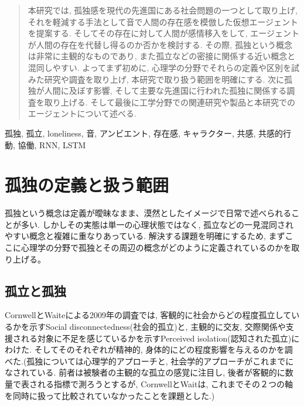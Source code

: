 \documentclass[a4paper,dvipdfmx]{hisken}
\begin{document}

\begin{abstract}
本研究では, 孤独感を現代の先進国にある社会問題の一つとして取り上げ, それを軽減する手法として音で人間の存在感を模倣した仮想エージェントを提案する. そしてその存在に対して人間が感情移入をして, エージェントが人間の存在を代替し得るのか否かを検討する. その際, 孤独という概念は非常に主観的なものであり, また孤立などの密接に関係する近い概念と混同しやすい. よってまず初めに, 心理学の分野でそれらの定義や区別を試みた研究や調査を取り上げ, 本研究で取り扱う範囲を明確にする. 次に孤独が人間に及ぼす影響, そして主要な先進国に行われた孤独に関係する調査を取り上げる. そして最後に工学分野での関連研究や製品と本研究でのエージェントについて述べる.
\end{abstract}

\begin{keyword}	
孤独, 孤立, loneliness, 音, アンビエント, 存在感, キャラクター, 共感, 共感的行動, 協働, RNN, LSTM
\end{keyword}

\maketitle
	
\section{孤独の定義と扱う範囲}
孤独という概念は定義が曖昧なまま、漠然としたイメージで日常で述べられることが多い. しかしその実態は単一の心理状態ではなく, 孤立などの一見混同されやすい概念と複雑に重なりあっている. 解決する課題を明確にするため, まずここに心理学の分野で孤独とその周辺の概念がどのように定義されているのかを取り上げる。
\subsection{孤立と孤独}

CornwellとWaiteによる2009年の調査では, 客観的に社会からどの程度孤立しているかを示すSocial disconnectedness(社会的孤立)と, 主観的に交友, 交際関係や支援される対象に不足を感じているかを示すPerceived isolation(認知された孤立)にわけた{}\cite{tex1}. そしてそのそれぞれが精神的, 身体的にどの程度影響を与えるのかを調べた.(孤独については心理学的アプローチと, 社会学的アプローチがこれまでになされている. 前者は被験者の主観的な孤立の感覚に注目し, 後者が客観的に数量で表される指標で測ろうとするが, CornwellとWaitは, これまでその２つの軸を同時に扱って比較されていなかったことを課題とした.)
\end{document}
